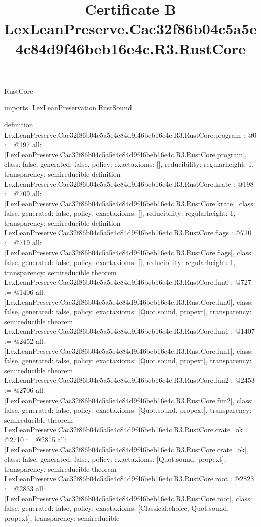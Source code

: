 \begin{lexlean}{RustCore}
\title{Certificate B LexLeanPreserve.Cac32f86b04c5a5e4c84d9f46beb16e4c.R3.RustCore}
\begin{coremodule}
imports [LexLeanPreservation.RustSound]

definition LexLeanPreserve.Cac32f86b04c5a5e4c84d9f46beb16e4c.R3.RustCore.program : @0 := @197 {
  all: [LexLeanPreserve.Cac32f86b04c5a5e4c84d9f46beb16e4c.R3.RustCore.program],
  class: false,
  generated: false,
  policy: exact{axioms: []},
  reducibility: regular{height: 1},
  transparency: semireducible
}
definition LexLeanPreserve.Cac32f86b04c5a5e4c84d9f46beb16e4c.R3.RustCore.krate : @198 := @709 {
  all: [LexLeanPreserve.Cac32f86b04c5a5e4c84d9f46beb16e4c.R3.RustCore.krate],
  class: false,
  generated: false,
  policy: exact{axioms: []},
  reducibility: regular{height: 1},
  transparency: semireducible
}
definition LexLeanPreserve.Cac32f86b04c5a5e4c84d9f46beb16e4c.R3.RustCore.flags : @710 := @719 {
  all: [LexLeanPreserve.Cac32f86b04c5a5e4c84d9f46beb16e4c.R3.RustCore.flags],
  class: false,
  generated: false,
  policy: exact{axioms: []},
  reducibility: regular{height: 1},
  transparency: semireducible
}
theorem LexLeanPreserve.Cac32f86b04c5a5e4c84d9f46beb16e4c.R3.RustCore.fun0 : @727 := @1406 {
  all: [LexLeanPreserve.Cac32f86b04c5a5e4c84d9f46beb16e4c.R3.RustCore.fun0],
  class: false,
  generated: false,
  policy: exact{axioms: [Quot.sound, propext]},
  transparency: semireducible
}
theorem LexLeanPreserve.Cac32f86b04c5a5e4c84d9f46beb16e4c.R3.RustCore.fun1 : @1407 := @2452 {
  all: [LexLeanPreserve.Cac32f86b04c5a5e4c84d9f46beb16e4c.R3.RustCore.fun1],
  class: false,
  generated: false,
  policy: exact{axioms: [Quot.sound, propext]},
  transparency: semireducible
}
theorem LexLeanPreserve.Cac32f86b04c5a5e4c84d9f46beb16e4c.R3.RustCore.fun2 : @2453 := @2706 {
  all: [LexLeanPreserve.Cac32f86b04c5a5e4c84d9f46beb16e4c.R3.RustCore.fun2],
  class: false,
  generated: false,
  policy: exact{axioms: [Quot.sound, propext]},
  transparency: semireducible
}
theorem LexLeanPreserve.Cac32f86b04c5a5e4c84d9f46beb16e4c.R3.RustCore.crate_ok : @2710 := @2815 {
  all: [LexLeanPreserve.Cac32f86b04c5a5e4c84d9f46beb16e4c.R3.RustCore.crate_ok],
  class: false,
  generated: false,
  policy: exact{axioms: [Quot.sound, propext]},
  transparency: semireducible
}
theorem LexLeanPreserve.Cac32f86b04c5a5e4c84d9f46beb16e4c.R3.RustCore.root : @2823 := @2833 {
  all: [LexLeanPreserve.Cac32f86b04c5a5e4c84d9f46beb16e4c.R3.RustCore.root],
  class: false,
  generated: false,
  policy: exact{axioms: [Classical.choice, Quot.sound, propext]},
  transparency: semireducible
}


\end{coremodule}
\end{lexlean}
